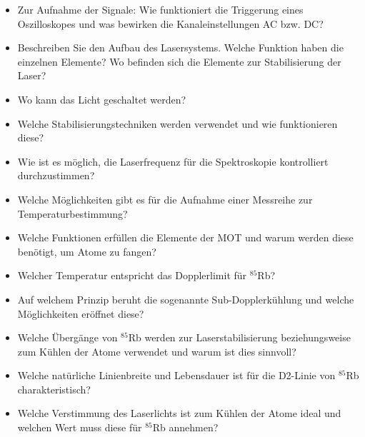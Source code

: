 \documentclass[
class=book,
accentcolor=1b,
custommargins=geometry,
fontsize=11pt,
thesis={type=Versuchsanleitung},
ruledheaders=all,
headline=false,
instbox=false,
marginpar=false,
title=small,
ignore-missing-data=true,
twoside=false,
logofile=apqdesign/tuda_logo.pdf,
pdfa=false %
]{apqpub}
\begin{document}
					\begin{itemize}
						\item Zur Aufnahme der Signale: Wie funktioniert die Triggerung eines Oszilloskopes und was bewirken die Kanaleinstellungen AC bzw. DC? 
						
						\item Beschreiben Sie den Aufbau des Lasersystems. Welche Funktion haben die einzelnen Elemente? Wo befinden sich die Elemente zur Stabilisierung der Laser? 
						
						\item Wo kann das Licht geschaltet werden?
						
						\item Welche Stabilisierungstechniken werden verwendet und wie funktionieren diese?
						
						\item Wie ist es möglich, die Laserfrequenz für die Spektroskopie kontrolliert durchzustimmen?
						
						\item Welche Möglichkeiten gibt es für die Aufnahme einer Messreihe zur Temperaturbestimmung?
						
						\item Welche Funktionen erfüllen die Elemente der MOT und warum werden diese benötigt, um Atome zu fangen?
						
						\item Welcher Temperatur entspricht das Dopplerlimit für $^{85}$Rb?
						
						\item Auf welchem Prinzip beruht die sogenannte Sub-Dopplerkühlung und welche Möglichkeiten eröffnet diese?
						
						\item Welche Übergänge von $^{85}$Rb werden zur Laserstabilisierung beziehungsweise zum Kühlen der Atome verwendet und warum ist dies sinnvoll?
						
						\item Welche natürliche Linienbreite und Lebensdauer ist für die D2-Linie von $^{85}$Rb charakteristisch?
						
						\item Welche Verstimmung des Laserlichts ist zum Kühlen der Atome ideal und welchen Wert muss diese für $^{85}$Rb annehmen?
						
						
					\end{itemize}
					
					
					
\end{document}
